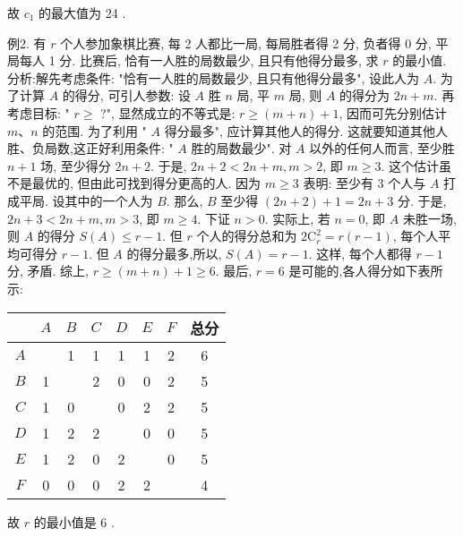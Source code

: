 故 $c_1$ 的最大值为 24 .



例2. 有 $r$ 个人参加象棋比赛, 每 2 人都比一局, 每局胜者得 2 分, 负者得 0 分, 平局每人 1 分.
比赛后, 恰有一人胜的局数最少, 且只有他得分最多, 求 $r$ 的最小值.
分析:解先考虑条件: "恰有一人胜的局数最少, 且只有他得分最多", 设此人为 $A$. 为了计算 $A$ 的得分, 可引人参数: 设 $A$ 胜 $n$ 局, 平 $m$ 局, 则 $A$ 的得分为 $2 n+m$.
再考虑目标: " $r \geqslant$ ?", 显然成立的不等式是: $r \geqslant(m+n)+1$, 因而可先分别估计 $m 、 n$ 的范围.
为了利用 " $A$ 得分最多", 应计算其他人的得分.
这就要知道其他人胜、负局数,这正好利用条件: " $A$ 胜的局数最少". 对 $A$ 以外的任何人而言, 至少胜 $n+1$ 场, 至少得分 $2 n+2$. 于是, $2 n+2<2 n+m, m>2$, 即 $m \geqslant 3$.
这个估计虽不是最优的, 但由此可找到得分更高的人.
因为 $m \geqslant 3$ 表明: 至少有 3 个人与 $A$ 打成平局.
设其中的一个人为 $B$. 那么, $B$ 至少得 $(2 n+2)+1=2 n+3$ 分.
于是, $2 n+3<2 n+m, m>3$, 即 $m \geqslant 4$.
下证 $n>0$. 实际上, 若 $n=0$, 即 $A$ 未胜一场, 则 $A$ 的得分 $S(A) \leqslant r-1$. 但 $r$ 个人的得分总和为 $2 \mathrm{C}_r^2=r(r-1)$, 每个人平均可得分 $r-1$. 但 $A$ 的得分最多,所以, $S(A)=r-1$. 这样, 每个人都得 $r-1$ 分, 矛盾.
综上, $r \geqslant(m+n)+1 \geqslant 6$.
最后, $r=6$ 是可能的,各人得分如下表所示:
\begin{tabular}{|c|c|c|c|c|c|c|c|}
\hline & $A$ & $B$ & $C$ & $D$ & $E$ & $F$ & 总分 \\
\hline$A$ & & 1 & 1 & 1 & 1 & 2 & 6 \\
\hline$B$ & 1 & & 2 & 0 & 0 & 2 & 5 \\
\hline$C$ & 1 & 0 & & 0 & 2 & 2 & 5 \\
\hline$D$ & 1 & 2 & 2 & & 0 & 0 & 5 \\
\hline$E$ & 1 & 2 & 0 & 2 & & 0 & 5 \\
\hline$F$ & 0 & 0 & 0 & 2 & 2 & & 4 \\
\hline
\end{tabular}
故 $r$ 的最小值是 6 .



